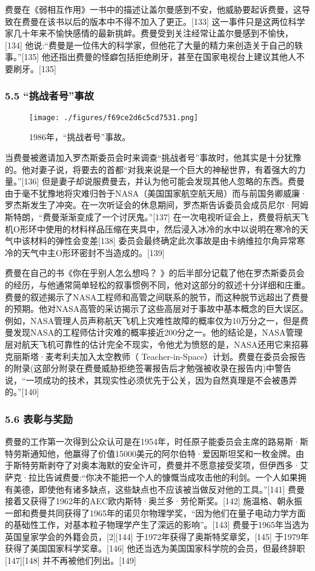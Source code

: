 费曼在《弱相互作用》一书中的描述让盖尔曼感到不安，他威胁要起诉费曼，这导致在费曼在该书以后的版本中不得不加入了更正。[133] 这一事件只是这两位科学家几十年来不愉快感情的最新挑衅。费曼受到关注经常让盖尔曼感到不愉快，[134] 他说:“费曼是一位伟大的科学家，但他花了大量的精力来创造关于自己的轶事。”[135] 他还指出费曼的怪癖包括拒绝刷牙，甚至在国家电视台上建议其他人不要刷牙。[135]

\subsubsection{5.5 “挑战者号”事故}
\begin{figure}[ht]
\centering
\texttt{[image: ./figures/f69ce2d6c5cd7531.png]}
\caption{1986年，“挑战者号”事故。} \label{fig_Feynma_6}
\end{figure}
当费曼被邀请加入罗杰斯委员会时来调查“挑战者号”事故时，他其实是十分犹豫的。他对妻子说，将要去的首都“对我来说是一个巨大的神秘世界，有着强大的力量。”[136] 但是妻子却说服费曼去，并认为他可能会发现其他人忽略的东西。费曼由于毫不犹豫地将灾难归咎于NASA（美国国家航空航天局）而与前国务卿威廉·罗杰斯发生了冲突。在一次听证会的休息期间，罗杰斯告诉委员会成员尼尔·阿姆斯特朗，“费曼渐渐变成了一个讨厌鬼。”[137] 在一次电视听证会上，费曼将航天飞机O形环中使用的材料样品压缩在夹具中，然后浸入冰冷的水中以说明在寒冷的天气中该材料的弹性会变差[138] 委员会最终确定此次事故是由卡纳维拉尔角异常寒冷的天气中主O形环密封不当造成的。[139]

费曼在自己的书《你在乎别人怎么想吗？ 》的后半部分记载了他在罗杰斯委员会的经历，与他通常简单轻松的叙事惯例不同，他对这部分的叙述十分详细和庄重。费曼的叙述揭示了NASA工程师和高管之间联系的脱节，而这种脱节远超出了费曼的预期。他对NASA高管的采访揭示了这些高层对于事故中基本概念的巨大误区。例如，NASA管理人员声称航天飞机上灾难性故障的概率仅为10万分之一，但是费曼发现NASA的工程师估计灾难的概率接近200分之一。他的结论是，NASA管理层对航天飞机可靠性的估计完全不现实，令他尤为愤怒的是，NASA还用它来招募克丽斯塔·麦考利夫加入太空教师（ Teacher-in-Space）计划。费曼在委员会报告的附录(这部分附录在费曼威胁拒绝签署报告后才勉强被收录在报告内)中警告说，“一项成功的技术，其现实性必须优先于公关，因为自然真理是不会被愚弄的。”[140]

\subsubsection{5.6 表彰与奖励}
费曼的工作第一次得到公众认可是在1954年，时任原子能委员会主席的路易斯·斯特劳斯通知他，他赢得了价值15000美元的阿尔伯特·爱因斯坦奖和一枚金牌。由于斯特劳斯剥夺了对奥本海默的安全许可，费曼并不愿意接受奖项，但伊西多·艾萨克·拉比告诫费曼:“你决不能把一个人的慷慨当成攻击他的利剑。一个人如果拥有美德，即使他有诸多缺点，这些缺点也不应该被当做反对他的工具。”[141] 费曼接着又获得了1962年的AEC欧内斯特·奥兰多·劳伦斯奖。[142] 施温格、朝永振一郎和费曼共同获得了1965年的诺贝尔物理学奖，“因为他们在量子电动力学方面的基础性工作，对基本粒子物理学产生了深远的影响”。[143] 费曼于1965年当选为英国皇家学会的外籍会员，[2][144] 于1972年获得了奥斯特奖章奖，[145] 于1979年获得了美国国家科学奖章。[146] 他还当选为美国国家科学院的会员，但最终辞职[147][148] 并不再被他们列出。[149]

